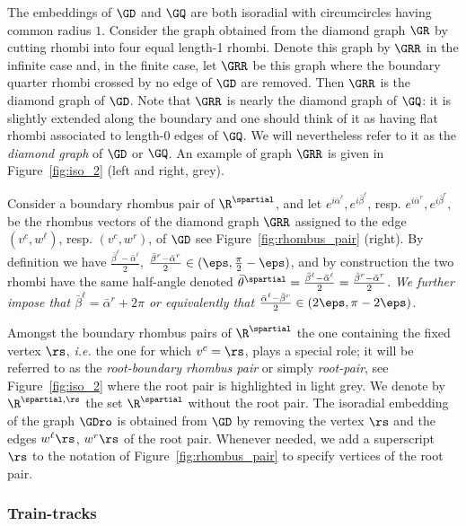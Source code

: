 \documentclass[a4paper,twoside,11pt]{article}
\begin{document}
The embeddings of $\GD$ and $\GQ$ are both isoradial with circumcircles having common radius $1$. 
Consider the graph obtained from the diamond graph $\GR$ by cutting rhombi into four equal length-1 rhombi. Denote this graph 
by $\GRR$ in the infinite case and, in the finite case, let $\GRR$ be this graph where 
the boundary quarter rhombi crossed by no edge of $\GD$ are removed.
Then $\GRR$ is the diamond graph of $\GD$. Note that $\GRR$ is nearly the diamond graph of $\GQ$: it is slightly extended along the 
boundary and one should think of it as having flat rhombi associated to length-0 edges of $\GQ$. We will nevertheless refer to it
as the \emph{diamond graph} of $\GD$ or $\GQ$.
An example of graph $\GRR$ is given in Figure~\ref{fig:iso_2} (left and right, grey).

Consider a boundary rhombus pair of $\R^\spartial$, and
let $e^{i\bar{\alpha}^\ell},e^{i\bar{\beta}^\ell}$, resp. $e^{i\bar{\alpha}^r},e^{i\bar{\beta}^r},$ be the rhombus vectors of 
the diamond graph $\GRR$ assigned to the edge $(v^c,w^\ell)$, resp. $(v^c,w^r)$, of $\GD$ see Figure~\ref{fig:rhombus_pair} (right).
By definition we have
$\frac{\bar{\beta}^\ell-\bar{\alpha}^\ell}{2}$, $\frac{\bar{\beta}^r-\bar{\alpha}^r}{2}\in(\eps,\frac{\pi}{2}-\eps)$, and 
by construction the two rhombi have the same half-angle denoted $\bar{\theta}^\spartial=\frac{\bar{\beta}^\ell-\bar{\alpha}^\ell}{2}=
\frac{\bar{\beta}^r-\bar{\alpha}^r}{2}$.
\emph{We further impose that
$\bar{\beta}^\ell=\bar{\alpha}^r+2\pi$ or equivalently that $\frac{\bar{\alpha}^\ell-\bar{\beta}^r}{2}\in(2\eps,\pi-2\eps)$.}

Amongst the boundary rhombus pairs of $\R^\spartial$ the one containing 
the fixed vertex $\rs$, \emph{i.e.} the one for which  $v^c=\rs$, plays a special role; it will be referred to as the 
\emph{root-boundary rhombus pair} or simply \emph{root-pair}, see Figure~\ref{fig:iso_2} where the root pair is highlighted in 
light grey. We 
denote by  
$\R^{\spartial,\rs}$ the set $\R^\spartial$ without the root pair.
The isoradial embedding of the graph $\GDro$ is obtained from $\GD$ by removing the vertex $\rs$ and the edges 
$w^\ell \rs$, $w^r \rs$ of the root pair. Whenever needed, we add a superscript $\rs$ to the notation of Figure~\ref{fig:rhombus_pair} to 
specify vertices of the root pair. 

\subsubsection{Train-tracks}\label{sec:train_tracks}
\end{document}
